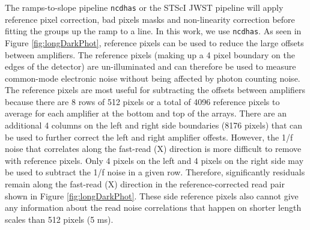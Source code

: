 \documentclass{aastex62}
\begin{document}
The ramps-to-slope pipeline \texttt{ncdhas} or the STScI JWST pipeline will apply reference pixel correction, bad pixels masks and non-linearity correction before fitting the groups up the ramp to a line.
In this work, we use \texttt{ncdhas}.
As seen in Figure \ref{fig:longDarkPhot}, reference pixels can be used to reduce the large offsets between amplifiers.
The reference pixels (making up a 4 pixel boundary on the edges of the detector) are un-illuminated and can therefore be used to measure common-mode electronic noise without being affected by photon counting noise.
The reference pixels are most useful for subtracting the offsets between amplifiers because there are 8 rows of 512 pixels or a total of 4096 reference pixels to average for each amplifier at the bottom and top of the arrays.
There are an additional 4 columns on the left and right side boundaries (8176 pixels) that can be used to further correct the left and right amplifier offests.
However, the 1/f noise that correlates along the fast-read (X) direction is more difficult to remove with reference pixels.
Only 4 pixels on the left and 4 pixels on the right side may be used to subtract the 1/f noise in a given row.
Therefore, significantly residuals remain along the fast-read (X) direction in the reference-corrected read pair shown in Figure \ref{fig:longDarkPhot}.
These side reference pixels also cannot give any information about the read noise correlations that happen on shorter length scales than 512 pixels (5 ms).
\end{document}
